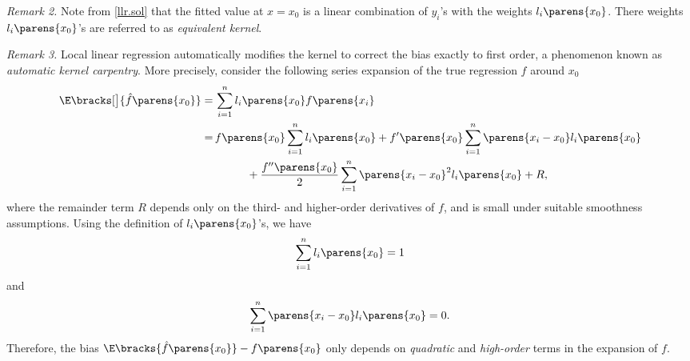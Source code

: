 \documentclass[12pt]{article}
\begin{document}
\begin{enumerate}[label=\textbf{\arabic*.}]
	\textit{Remark 2.} Note from \eqref{llr.sol} that the fitted value at $x = x_0$ is a linear combination of $y_i$'s with the weights $l_i \parens{x_0}$. There weights $l_i \parens{x_0}$'s are referred to as \textit{equivalent kernel}. 
	
	\textit{Remark 3.} Local linear regression automatically modifies the kernel to correct the bias exactly to first order, a phenomenon known as \textit{automatic kernel carpentry}. More precisely, consider the following series expansion of the true regression $f$ around $x_0$
	\begin{equation}
		\begin{aligned}
			\E \bracks[\big]{\hat{f} \parens{x_0}} 
			= & \, \sum_{i=1}^n l_i \parens{x_0} f \parens{x_i} \\ 
			= & \, f \parens{x_0} \sum_{i=1}^n l_i \parens{x_0} + f' \parens{x_0} \sum_{i=1}^n \parens{x_i - x_0} l_i \parens{x_0} \nonumber \\ 
			& \qquad \quad + \frac{f''\parens{x_0}}{2} \sum_{i=1}^n \parens{x_i - x_0}^2 l_i\parens{x_0} + R, 
		\end{aligned}
	\end{equation}
	where the remainder term $R$ depends only on the third- and higher-order derivatives of $f$, and is small under suitable smoothness assumptions. Using the definition of $l_i \parens{x_0}$'s, we have 
	\begin{equation}\label{eq-ex6.2-1}
		\sum_{i=1}^n l_i \parens{x_0} = 1
	\end{equation}
	and 
	\begin{equation}\label{eq-ex6.2-2}
		\sum_{i=1}^n \parens{x_i - x_0} l_i \parens{x_0} = 0. 
	\end{equation}
	Therefore, the bias $\E \bracks{\hat{f} \parens{x_0}} - f \parens{x_0}$ only depends on \emph{quadratic} and \emph{high-order} terms in the expansion of $f$. 
	

\end{enumerate}
\end{document}
